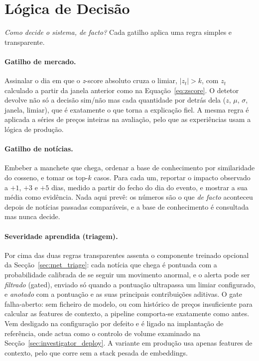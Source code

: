 \section{Lógica de Decisão}
\label{sec:investigator_logic}

\emph{Como decide o sistema, de facto?} Cada gatilho aplica uma regra simples e transparente.

\paragraph{Gatilho de mercado.} Assinalar o dia em que o \emph{z}-score absoluto cruza o limiar,
$|z_t|>k$, com $z_t$ calculado a partir da janela anterior como na Equação~\ref{eq:zscore}. O detetor
devolve não só a decisão sim/não mas cada quantidade por detrás dela ($z$, $\mu$, $\sigma$, janela,
limiar), que é exatamente o que torna a explicação fiel. A mesma regra é aplicada a séries de preços
inteiras na avaliação, pelo que as experiências usam a lógica de produção.

\paragraph{Gatilho de notícias.} Embeber a manchete que chega, ordenar a base de conhecimento por
similaridade do cosseno, e tomar os top-$k$ casos. Para cada um, reportar o impacto observado a $+1$, $+3$ e
$+5$ dias, medido a partir do fecho do dia do evento, e mostrar a sua média como evidência. Nada aqui prevê:
os números são o que \emph{de facto} aconteceu depois de notícias passadas comparáveis, e a base de
conhecimento é consultada mas nunca decide.

\paragraph{Severidade aprendida (triagem).} Por cima das duas regras transparentes assenta o componente
treinado opcional da Secção~\ref{sec:met_triage}: cada notícia que chega é pontuada com a probabilidade
calibrada de se seguir um movimento anormal, e o alerta pode ser \emph{filtrado} (gated), enviado só quando
a pontuação ultrapassa um limiar configurado, e \emph{anotado} com a pontuação e as suas principais
contribuições aditivas. O gate falha-aberto: sem ficheiro de modelo, ou com
histórico de preços insuficiente para calcular as features de contexto, a pipeline comporta-se exatamente
como antes. Vem desligado na configuração por defeito e é ligado na implantação de referência, onde actua
como o controlo de volume examinado na Secção~\ref{sec:investigator_deploy}. A variante em produção
usa apenas features de contexto, pelo
que corre sem a stack pesada de embeddings.


